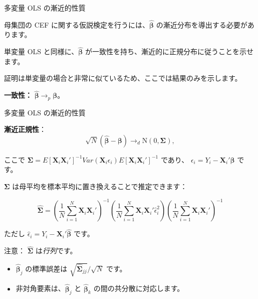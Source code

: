 \documentclass[11pt,handout]{beamer}
\newenvironment{wideitemize}{\itemize\addtolength{\itemsep}{10pt}}{\enditemize}
\begin{document}
	\begin{frame}{多変量 OLS の漸近的性質} 
		\begin{wideitemize}
			
		\item
		母集団の CEF に関する仮説検定を行うには、$\bm{\hat\beta}$ の漸近分布を導出する必要があります。
		
		\pause
			
		\item
		単変量 OLS と同様に、$\bm{\hat\beta}$ が一致性を持ち、漸近的に正規分布に従うことを示せます。
		\pause
	
		\item
		証明は単変量の場合と非常に似ているため、ここでは結果のみを示します。
		
		\pause
		\item
		\textbf{一致性：} $\bm{\hat\beta} \rightarrow_p \bm{\beta}$。
		
		\end{wideitemize}
	\end{frame}

	\begin{frame}{多変量 OLS の漸近的性質} 
		\begin{wideitemize}
			\item
			\textbf{漸近正規性}：
			$$\sqrt{N} (\bm{\hat\beta} - \bm{\beta}) \rightarrow_d \mathrm{N}(0, \bm{\Sigma}),$$
			
			\noindent ここで $\bm{\Sigma} = E[ \bm{X}_i \bm{X}_i' ]^{-1} Var( \bm{X}_i \epsilon_i  )	E[ \bm{X}_i \bm{X}_i' ]^{-1} $ であり、 $\epsilon_i = Y_i - \bm{X}_i' \bm{\beta}$ です。
			
			
			\pause
			\item 
			$\bm{\Sigma}$ は母平均を標本平均に置き換えることで推定できます：
			
			$$\bm{\hat\Sigma} = \left( \frac{1}{N} \sum_{i=1}^N \bm{X}_i \bm{X}_i' \right)^{-1} \left(\frac{1}{N} \sum_{i=1}^N \bm{X}_i \bm{X}_i' \hat\epsilon_i^2  \right) \left( \frac{1}{N} \sum_{i=1}^N \bm{X}_i \bm{X}_i' \right)^{-1}  $$
			
			ただし $\hat\epsilon_i = Y_i - \bm{X}_i' \bm{\hat\beta}$ です。
			
			
			\item\pause{}
			注意： $\bm{\hat\Sigma}$ は\textit{行列}です。
				\begin{itemize}
					\item 
					$\bm{\hat\beta}_j$ の標準誤差は $\sqrt{\bm{\hat\Sigma}_{jj}} / \sqrt{N}$ です。
					
					\item
					非対角要素は、$\bm{\hat\beta}_j$ と $\bm{\hat\beta}_k$ の間の共分散に対応します。
				\end{itemize}
			
		\end{wideitemize}
	\end{frame}
\end{document}
